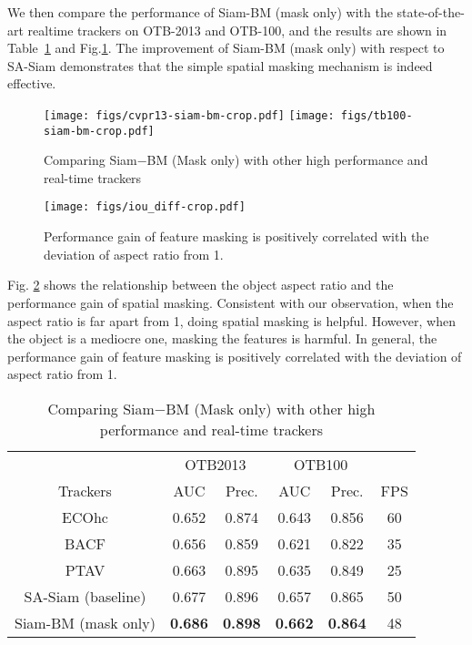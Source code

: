 \documentclass[runningheads]{llncs}
\begin{document}
We then compare the performance of Siam-BM (mask only) with the state-of-the-art realtime trackers on OTB-2013 and OTB-100, and the results are shown in Table~\ref{table:mask_cmp_stoa} and Fig.\ref{fig:otb}. The improvement of Siam-BM (mask only) with respect to SA-Siam demonstrates that the simple spatial masking mechanism is indeed effective.     
\begin{figure}[th!]
    \begin{center}
    \texttt{[image: figs/cvpr13-siam-bm-crop.pdf]}
    \texttt{[image: figs/tb100-siam-bm-crop.pdf]}
    \end{center}
    \caption{Comparing Siam−BM (Mask only) with other high performance and real-time trackers}
    \label{fig:otb}
\end{figure}

\begin{figure}[th!]
    \begin{center}
    \texttt{[image: figs/iou\_diff-crop.pdf]}
    \end{center}
    \caption{Performance gain of feature masking is positively correlated with the deviation of aspect ratio from 1.}
\label{fig:mask-perf-gain} 
\end{figure}

Fig. \ref{fig:mask-perf-gain} shows the relationship between the object aspect ratio and the performance gain of spatial masking. Consistent with our observation, when the aspect ratio is far apart from 1, doing spatial masking is helpful. However, when the object is a mediocre one, masking the features is harmful. In general, the performance gain of feature masking is positively correlated with the deviation of aspect ratio from 1. 
    

\setlength{\tabcolsep}{4pt}
\begin{table}
\begin{center}
\caption{Comparing Siam−BM (Mask only) with other high performance and real-time trackers}
\label{table:mask_cmp_stoa}
\begin{tabular}{|c|c|c|c|c|c|}
    \hline
     &\multicolumn{2}{c|}{OTB2013}  &\multicolumn{2}{c|}{OTB100}&\\
    \cline{2-5}
    Trackers & AUC & Prec. & AUC & Prec. & FPS\\
    \hline
    ECOhc \cite{ECO} & 0.652 & 0.874& 0.643& 0.856 & 60\\
    BACF \cite{BACF}  & 0.656 & 0.859& 0.621& 0.822 & 35\\
    PTAV \cite{PTAV} & 0.663 & 0.895& 0.635& 0.849 &25\\
    \hline
    SA-Siam \cite{SASiam} (baseline) & 0.677 & 0.896& 0.657& 0.865&50\\
    Siam-BM (mask only) & \textbf{0.686} & \textbf{0.898}& \textbf{0.662}& \textbf{0.864}&48\\
    \hline
\end{tabular}
\end{center}
\end{table}
\setlength{\tabcolsep}{1.4pt}
\end{document}

